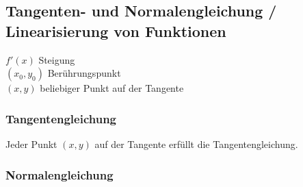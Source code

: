 \documentclass[11pt]{amsart}
\theoremstyle{remark}
\begin{document}
\subsection{Tangenten- und Normalengleichung / Linearisierung von Funktionen}
\begin{figure}[h]
  \centering
 \end{figure}
 $f'(x)$ Steigung\\
 $(x_0,y_0)$ Ber\"uhrungspunkt\\
 $(x,y)$ beliebiger Punkt auf der Tangente
 \subsubsection{Tangentengleichung}
\begin{figure}[h]
  \centering
  \end{figure}
 Jeder Punkt $(x,y)$ auf der Tangente erf\"ullt die Tangentengleichung.
 \subsubsection{Normalengleichung}
\begin{figure}[h]
  \centering
  \end{figure}
\end{document}
